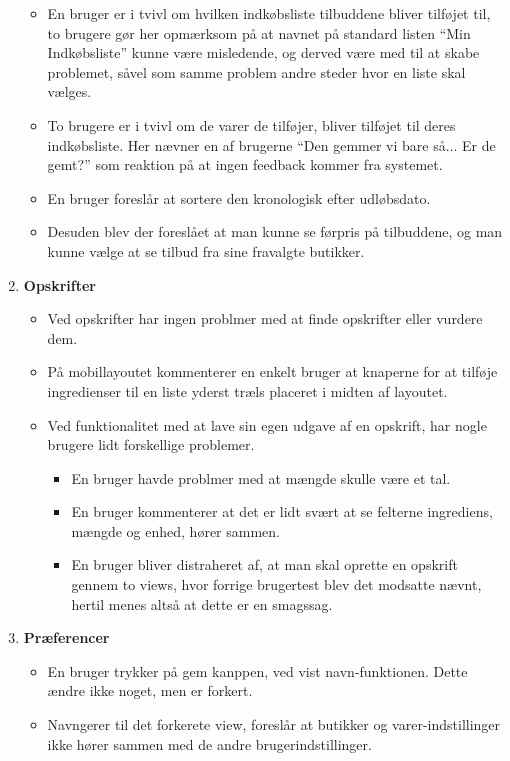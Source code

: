 \begin{enumerate}
\begin{itemize}
      \item En bruger er i tvivl om hvilken indkøbsliste tilbuddene bliver tilføjet til, to brugere gør her opmærksom på at navnet på standard listen ``Min Indkøbsliste'' kunne være misledende, og derved være med til at skabe problemet, såvel som samme problem andre steder hvor en liste skal vælges.
      \item To brugere er i tvivl om de varer de tilføjer, bliver tilføjet til deres indkøbsliste.
      Her nævner en af brugerne ``Den gemmer vi bare så... Er de gemt?'' som reaktion på at ingen feedback kommer fra systemet.
      \item En bruger foreslår at sortere den kronologisk efter udløbsdato.
      \item Desuden blev der foreslået at man kunne se førpris på tilbuddene, og man kunne vælge at se tilbud fra sine fravalgte butikker.
   \end{itemize}
   \item \textbf{Opskrifter}
   \begin{itemize}
      \item Ved opskrifter har ingen problmer med at finde opskrifter eller vurdere dem.
      \item På mobillayoutet kommenterer en enkelt bruger at knaperne for at tilføje ingredienser til en liste yderst træls placeret i midten af layoutet.
      \item Ved funktionalitet med at lave sin egen udgave af en opskrift, har nogle brugere lidt forskellige problemer.
      \begin{itemize}
         \item En bruger havde problmer med at mængde skulle være et tal.
         \item En bruger kommenterer at det er lidt svært at se felterne ingrediens, mængde og enhed, hører sammen.
         \item En bruger bliver distraheret af, at man skal oprette en opskrift gennem to views, hvor forrige brugertest blev det modsatte nævnt, hertil menes altså at dette er en smagssag.
      \end{itemize} 
   \end{itemize}
   \item \textbf{Præferencer}
   \begin{itemize}
      \item En bruger  trykker på gem kanppen, ved vist navn-funktionen. 
      Dette ændre ikke noget, men er forkert.
      \item Navngerer til det forkerete view, foreslår at butikker og varer-indstillinger ikke hører sammen med de andre brugerindstillinger.

\end{itemize}
\end{enumerate}
